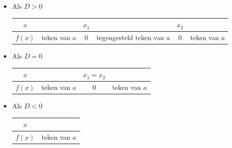 \begin{itemize}
\item Als $D>0$ \\
\begin{center}
	\begin{tabular}{c||c|c|c|c|c}
$x$ &  & $x_{1}$ &  & $x_{2}$ & \\
\hline 
$f(x)$ & teken van $a$ & 0 & tegengesteld teken van $a$ & 0 & teken van $a$\\
\end{tabular}
\end{center}
\item Als $D=0$ \\
\begin{center}
	\begin{tabular}{c||c|c|c}
	$x$ &  & $x_{1}=x_{2}$ & \\
	\hline 
	$f(x)$ & teken van $a$ & 0 & teken van $a$\\
\end{tabular}
\end{center}
\item Als $D<0$ \\
\begin{center}
	\begin{tabular}{c||c}
$x$ & \\
\hline 
$f(x)$ & teken van $a$\\
\end{tabular}
\end{center}
\end{itemize}


